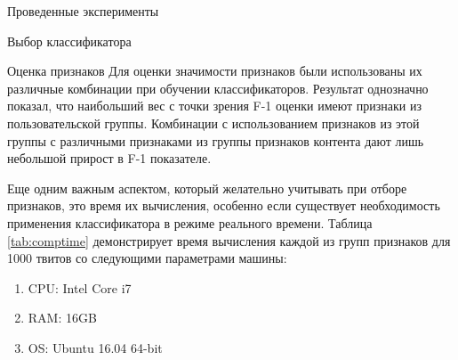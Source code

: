 \begin{section}{Проведенные эксперименты}
\begin{subsection}{Выбор классификатора}
\begin{table}[H]
\centering
{}

\caption{Сравнение показателей классификатора}
\label{tab:results}
\end{table}



\end{subsection}


\begin{subsection}{Оценка признаков}
Для оценки значимости признаков были использованы их различные комбинации  при обучении классификаторов. Результат однозначно показал, что наибольший вес с точки зрения F-1 оценки имеют признаки из пользовательской группы. Комбинации с использованием признаков из этой группы с различными признаками из группы признаков контента дают лишь небольшой прирост в F-1 показателе.

Еще одним важным аспектом, который желательно учитывать при отборе признаков, это время их вычисления, особенно если существует необходимость применения классификатора в режиме реального времени. Таблица \ref{tab:comptime} демонстрирует время вычисления каждой из групп признаков для 1000 твитов со следующими параметрами машины:
\begin{enumerate}
\item CPU: Intel Core i7
\item RAM: 16GB
\item OS: Ubuntu 16.04 64-bit
\end{enumerate}



\begin{table}[H]
\centering
{}


\end{table}
\end{subsection}
\end{section}
